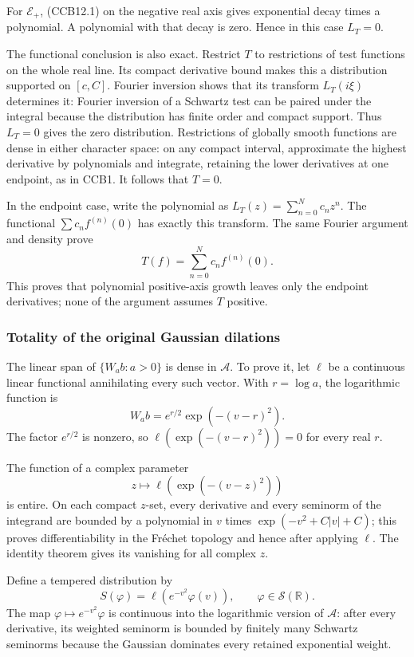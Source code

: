 For \(\mathscr E_+\), (CCB12.1) on the negative real axis gives
exponential decay times a polynomial. A polynomial with that decay is
zero. Hence in this case \(L_T=0\).

The functional conclusion is also exact. Restrict \(T\) to restrictions
of test functions on the whole real line. Its compact derivative bound
makes this a distribution supported on \([c,C]\). Fourier inversion
shows that its transform \(L_T(i\xi)\) determines it: Fourier inversion
of a Schwartz test can be paired under the integral because the
distribution has finite order and compact support. Thus \(L_T=0\) gives
the zero distribution. Restrictions of globally smooth functions are
dense in either character space: on any compact interval, approximate
the highest derivative by polynomials and integrate, retaining the lower
derivatives at one endpoint, as in CCB1. It follows that \(T=0\).

In the endpoint case, write the polynomial as
\(L_T(z)=\sum_{n=0}^N c_nz^n\). The functional \(\sum c_nf^{(n)}(0)\)
has exactly this transform. The same Fourier argument and density prove
\[
\boxed{T(f)=\sum_{n=0}^N c_n f^{(n)}(0).}
\tag{CCB12.2}
\] This proves that polynomial positive-axis growth leaves only the
endpoint derivatives; none of the argument assumes \(T\) positive.

\subsubsection{Totality of the original Gaussian
dilations}\label{totality-of-the-original-gaussian-dilations}

The linear span of \(\{W_a b:a>0\}\) is dense in \(\mathcal A\). To
prove it, let \(\ell\) be a continuous linear functional annihilating
every such vector. With \(r=\log a\), the logarithmic function is \[
W_a b=e^{r/2}\exp(-(v-r)^2).
\] The factor \(e^{r/2}\) is nonzero, so \(\ell(\exp(-(v-r)^2))=0\) for
every real \(r\).

The function of a complex parameter \[
z\longmapsto \ell(\exp(-(v-z)^2))
\] is entire. On each compact \(z\)-set, every derivative and every
seminorm of the integrand are bounded by a polynomial in \(v\) times
\(\exp(-v^2+C|v|+C)\); this proves differentiability in the Fréchet
topology and hence after applying \(\ell\). The identity theorem gives
its vanishing for all complex \(z\).

Define a tempered distribution by \[
S(\varphi)=\ell(e^{-v^2}\varphi(v)),\qquad\varphi\in\mathcal S(\mathbb R).
\] The map \(\varphi\mapsto e^{-v^2}\varphi\) is continuous into the
logarithmic version of \(\mathcal A\): after every derivative, its
weighted seminorm is bounded by finitely many Schwartz seminorms because
the Gaussian dominates every retained exponential weight.

